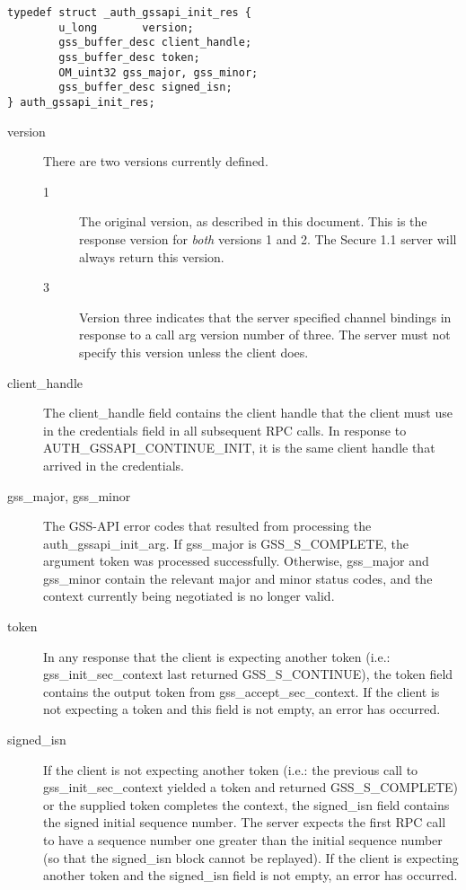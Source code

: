 \begin{verbatim}
typedef struct _auth_gssapi_init_res {
        u_long       version;
        gss_buffer_desc client_handle;
        gss_buffer_desc token;
        OM_uint32 gss_major, gss_minor;
        gss_buffer_desc signed_isn;
} auth_gssapi_init_res;
\end{verbatim}

\begin{description}
\item[version] There are two versions currently defined.
\begin{description}
\item[1] The original version, as described in this document.  This is
the response version for {\it both} versions 1 and 2.  The Secure 1.1
server will always return this version.

\item[3] Version three indicates that the server specified channel
bindings in response to a call arg version number of three.  The
server must not specify this version unless the client does.
\end{description}

\item[client_handle] The client_handle field contains the client
handle that the client must use in the credentials field in all
subsequent RPC calls.  In response to AUTH_GSSAPI_CONTINUE_INIT, it is
the same client handle that arrived in the credentials.

\item[gss_major, gss_minor] The GSS-API error codes that resulted from
processing the auth_gssapi_init_arg.  If gss_major is GSS_S_COMPLETE,
the argument token was processed successfully.  Otherwise, gss_major
and gss_minor contain the relevant major and minor status codes, and
the context currently being negotiated is no longer valid.

\item[token] In any response that the client is expecting another
token (i.e.: gss_init_sec_context last returned GSS_S_CONTINUE), the
token field contains the output token from gss_accept_sec_context.  If
the client is not expecting a token and this field is not empty, an
error has occurred.

\item[signed_isn]  If the client is not expecting another token (i.e.:
the previous call to gss_init_sec_context yielded a token and returned
GSS_S_COMPLETE) or the supplied token completes the context, the
signed_isn field contains the signed initial sequence number.  The
server expects the first RPC call to have a sequence number one
greater than the initial sequence number (so that the signed_isn block
cannot be replayed).  If the client is expecting another token and the
signed_isn field is not empty, an error has occurred.
\end{description}

